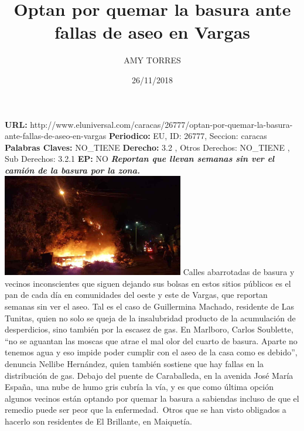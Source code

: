 \documentclass{article}%
\title{\textbf{Optan por quemar la basura ante fallas de aseo en Vargas}}%
\author{AMY TORRES}%
\date{26/11/2018}%
\begin{document}
%
\normalsize%
\maketitle%
\textbf{URL: }%
http://www.eluniversal.com/caracas/26777/optan{-}por{-}quemar{-}la{-}basura{-}ante{-}fallas{-}de{-}aseo{-}en{-}vargas\newline%
%
\textbf{Periodico: }%
EU, %
ID: %
26777, %
Seccion: %
caracas\newline%
%
\textbf{Palabras Claves: }%
NO\_TIENE\newline%
%
\textbf{Derecho: }%
3.2%
, Otros Derechos: %
NO\_TIENE%
, Sub Derechos: %
3.2.1%
\newline%
%
\textbf{EP: }%
NO\newline%
\newline%
%
\textbf{\textit{Reportan que llevan semanas sin ver el camión de la basura por la zona.}}%
\newline%
\newline%
%
\includegraphics[width=300px]{252.jpg}%
\newline%
%
Calles abarrotadas de basura y vecinos inconscientes que siguen dejando sus bolsas en estos sitios públicos es el pan de cada día en comunidades del oeste y este de Vargas, que reportan semanas sin ver el aseo.%
\newline%
%
Tal es el caso de Guillermina Machado, residente de Las Tunitas, quien no solo se queja de la insalubridad producto de la acumulación de desperdicios, sino también por la escasez de gas.%
\newline%
%
En Marlboro, Carlos Soublette, “no se aguantan las moscas que atrae el mal olor del cuarto de basura. Aparte no tenemos agua y eso impide poder cumplir con el aseo de la casa como es debido”, denuncia Nellibe Hernández, quien también sostiene que hay fallas en la distribución de gas.%
\newline%
%
Debajo del puente de Caraballeda, en la avenida José María España, una nube de humo gris cubría la vía, y es que como última opción algunos vecinos están optando por quemar la basura a sabiendas incluso de que el remedio puede ser peor que la enfermedad.~Otros que se han visto obligados a hacerlo son residentes de El Brillante, en Maiquetía.%
\end{document}
